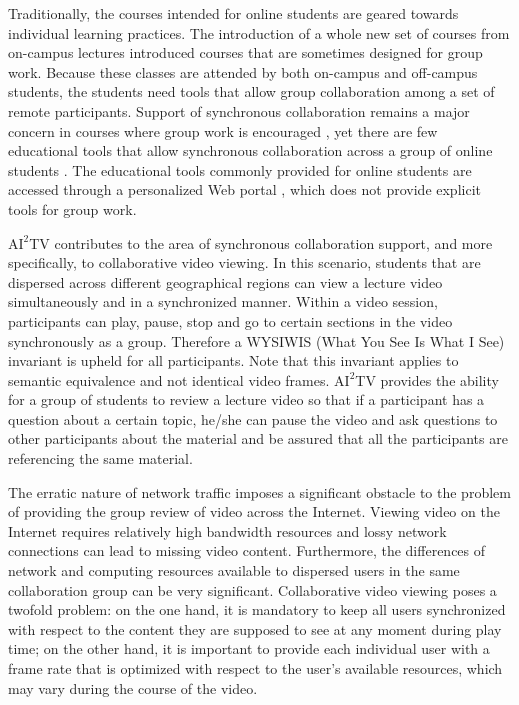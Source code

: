 \documentclass{sig-alternate}
\begin{document}
Traditionally, the courses intended for online students are geared
towards individual learning practices.  The introduction of a whole
new set of courses from on-campus lectures introduced courses that are
sometimes designed for group work.  Because these classes are attended
by both on-campus and off-campus students, the students need tools
that allow group collaboration among a set of remote participants.
Support of synchronous collaboration remains a major concern in
courses where group work is encouraged \cite{WELLS}, yet there are few
educational tools that allow synchronous collaboration across a group
of online students \cite{BURGESS}.  The educational tools commonly
provided for online students are accessed through a personalized Web
portal \cite{PHOENIX,CAPELLA}, which does not provide explicit tools
for group work.

$\mathrm{AI}^2$TV contributes to the area of synchronous collaboration
support, and more specifically, to collaborative video viewing.  In
this scenario, students that are dispersed across different
geographical regions can view a lecture video simultaneously and in a
synchronized manner.  Within a video session, participants can play,
pause, stop and go to certain sections in the video synchronously as a
group.  Therefore a WYSIWIS (What You See Is What I See) invariant is
upheld for all participants.  Note that this invariant applies to
semantic equivalence and not identical video frames.
$\mathrm{AI}^2$TV provides the ability for a group of students to
review a lecture video so that if a participant has a question about a
certain topic, he/she can pause the video and ask questions to other
participants about the material and be assured that all the
participants are referencing the same material.  


The erratic nature of network traffic imposes a significant obstacle
to the problem of providing the group review of video across the
Internet.  Viewing video on the Internet requires relatively high
bandwidth resources and lossy network connections can lead to missing
video content.  Furthermore, the differences of network and computing
resources available to dispersed users in the same collaboration group
can be very significant.  Collaborative video viewing poses a twofold
problem: on the one hand, it is mandatory to keep all users
synchronized with respect to the content they are supposed to see at
any moment during play time; on the other hand, it is important to
provide each individual user with a frame rate that is optimized with
respect to the user's available resources, which may vary during the
course of the video.
\end{document}
